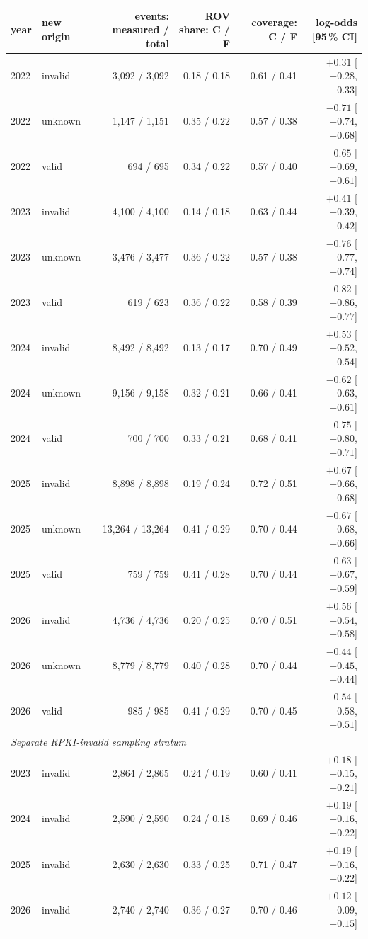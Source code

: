 \begin{tabular}{llrrrr}
\toprule
year & new origin & events: measured / total & ROV share: C / F & coverage: C / F & log-odds [95\,\% CI] \\
\midrule
2022 & invalid & 3,092 / 3,092 & 0.18 / 0.18 & 0.61 / 0.41 & $+0.31$ [$+0.28$, $+0.33$] \\
2022 & unknown & 1,147 / 1,151 & 0.35 / 0.22 & 0.57 / 0.38 & $-0.71$ [$-0.74$, $-0.68$] \\
2022 & valid & 694 / 695 & 0.34 / 0.22 & 0.57 / 0.40 & $-0.65$ [$-0.69$, $-0.61$] \\
2023 & invalid & 4,100 / 4,100 & 0.14 / 0.18 & 0.63 / 0.44 & $+0.41$ [$+0.39$, $+0.42$] \\
2023 & unknown & 3,476 / 3,477 & 0.36 / 0.22 & 0.57 / 0.38 & $-0.76$ [$-0.77$, $-0.74$] \\
2023 & valid & 619 / 623 & 0.36 / 0.22 & 0.58 / 0.39 & $-0.82$ [$-0.86$, $-0.77$] \\
2024 & invalid & 8,492 / 8,492 & 0.13 / 0.17 & 0.70 / 0.49 & $+0.53$ [$+0.52$, $+0.54$] \\
2024 & unknown & 9,156 / 9,158 & 0.32 / 0.21 & 0.66 / 0.41 & $-0.62$ [$-0.63$, $-0.61$] \\
2024 & valid & 700 / 700 & 0.33 / 0.21 & 0.68 / 0.41 & $-0.75$ [$-0.80$, $-0.71$] \\
2025 & invalid & 8,898 / 8,898 & 0.19 / 0.24 & 0.72 / 0.51 & $+0.67$ [$+0.66$, $+0.68$] \\
2025 & unknown & 13,264 / 13,264 & 0.41 / 0.29 & 0.70 / 0.44 & $-0.67$ [$-0.68$, $-0.66$] \\
2025 & valid & 759 / 759 & 0.41 / 0.28 & 0.70 / 0.44 & $-0.63$ [$-0.67$, $-0.59$] \\
2026 & invalid & 4,736 / 4,736 & 0.20 / 0.25 & 0.70 / 0.51 & $+0.56$ [$+0.54$, $+0.58$] \\
2026 & unknown & 8,779 / 8,779 & 0.40 / 0.28 & 0.70 / 0.44 & $-0.44$ [$-0.45$, $-0.44$] \\
2026 & valid & 985 / 985 & 0.41 / 0.29 & 0.70 / 0.45 & $-0.54$ [$-0.58$, $-0.51$] \\
\midrule
\multicolumn{6}{l}{\emph{Separate RPKI-invalid sampling stratum}} \\
2023 & invalid & 2,864 / 2,865 & 0.24 / 0.19 & 0.60 / 0.41 & $+0.18$ [$+0.15$, $+0.21$] \\
2024 & invalid & 2,590 / 2,590 & 0.24 / 0.18 & 0.69 / 0.46 & $+0.19$ [$+0.16$, $+0.22$] \\
2025 & invalid & 2,630 / 2,630 & 0.33 / 0.25 & 0.71 / 0.47 & $+0.19$ [$+0.16$, $+0.22$] \\
2026 & invalid & 2,740 / 2,740 & 0.36 / 0.27 & 0.70 / 0.46 & $+0.12$ [$+0.09$, $+0.15$] \\
\bottomrule
\end{tabular}
